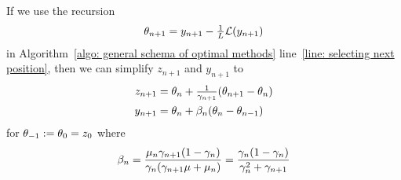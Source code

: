 \begin{lemma}\label{lem: streamline general schema of optimal methods}
	If we use the recursion
	\begin{align}\label{eq-lem-assmpt: weigth recursion}
		\theta_{n+1} = y_{n+1} - \tfrac1{L}\mathcal{L}(y_{n+1})
	\end{align}
	in Algorithm~\ref{algo: general schema of optimal methods} line~\ref{line:
	selecting next position}, then we can simplify \(z_{n+1}\) and \(y_{n+1}\)
	to
	\begin{align}
		\label{eq: z_n recursion}
		z_{n+1}
		&= \theta_n + \tfrac1{\gamma_{n+1}}(\theta_{n+1}-\theta_n)\\
		y_{n+1}
		&=\theta_n + \beta_n(\theta_n-\theta_{n-1})
	\end{align}
	for \(\theta_{-1}:=\theta_0=z_0\) where
	\begin{align}
		\beta_n
		= \frac{\mu_n \gamma_{n+1}(1-\gamma_n)}{\gamma_n(\gamma_{n+1}\mu +\mu_n)}
		= \frac{\gamma_n(1-\gamma_n)}{\gamma_n^2 + \gamma_{n+1}}
	\end{align}
\end{lemma}
